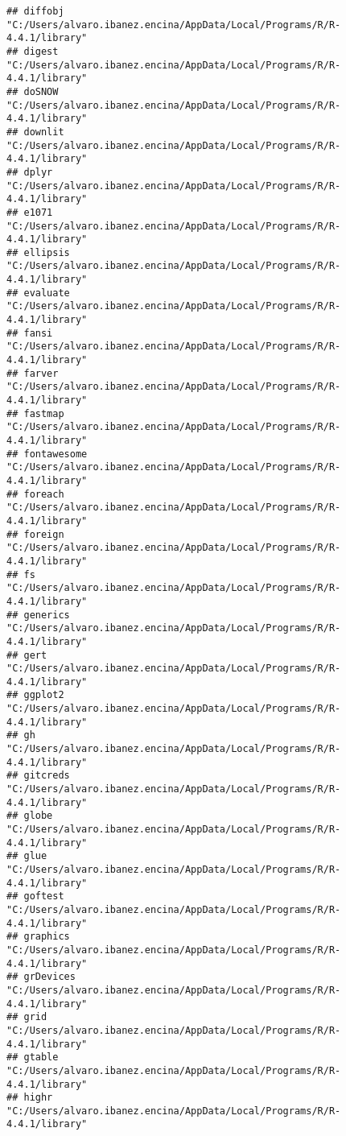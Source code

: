 \documentclass[
]{article}
\begin{document}
\begin{verbatim}
## diffobj            "C:/Users/alvaro.ibanez.encina/AppData/Local/Programs/R/R-4.4.1/library"
## digest             "C:/Users/alvaro.ibanez.encina/AppData/Local/Programs/R/R-4.4.1/library"
## doSNOW             "C:/Users/alvaro.ibanez.encina/AppData/Local/Programs/R/R-4.4.1/library"
## downlit            "C:/Users/alvaro.ibanez.encina/AppData/Local/Programs/R/R-4.4.1/library"
## dplyr              "C:/Users/alvaro.ibanez.encina/AppData/Local/Programs/R/R-4.4.1/library"
## e1071              "C:/Users/alvaro.ibanez.encina/AppData/Local/Programs/R/R-4.4.1/library"
## ellipsis           "C:/Users/alvaro.ibanez.encina/AppData/Local/Programs/R/R-4.4.1/library"
## evaluate           "C:/Users/alvaro.ibanez.encina/AppData/Local/Programs/R/R-4.4.1/library"
## fansi              "C:/Users/alvaro.ibanez.encina/AppData/Local/Programs/R/R-4.4.1/library"
## farver             "C:/Users/alvaro.ibanez.encina/AppData/Local/Programs/R/R-4.4.1/library"
## fastmap            "C:/Users/alvaro.ibanez.encina/AppData/Local/Programs/R/R-4.4.1/library"
## fontawesome        "C:/Users/alvaro.ibanez.encina/AppData/Local/Programs/R/R-4.4.1/library"
## foreach            "C:/Users/alvaro.ibanez.encina/AppData/Local/Programs/R/R-4.4.1/library"
## foreign            "C:/Users/alvaro.ibanez.encina/AppData/Local/Programs/R/R-4.4.1/library"
## fs                 "C:/Users/alvaro.ibanez.encina/AppData/Local/Programs/R/R-4.4.1/library"
## generics           "C:/Users/alvaro.ibanez.encina/AppData/Local/Programs/R/R-4.4.1/library"
## gert               "C:/Users/alvaro.ibanez.encina/AppData/Local/Programs/R/R-4.4.1/library"
## ggplot2            "C:/Users/alvaro.ibanez.encina/AppData/Local/Programs/R/R-4.4.1/library"
## gh                 "C:/Users/alvaro.ibanez.encina/AppData/Local/Programs/R/R-4.4.1/library"
## gitcreds           "C:/Users/alvaro.ibanez.encina/AppData/Local/Programs/R/R-4.4.1/library"
## globe              "C:/Users/alvaro.ibanez.encina/AppData/Local/Programs/R/R-4.4.1/library"
## glue               "C:/Users/alvaro.ibanez.encina/AppData/Local/Programs/R/R-4.4.1/library"
## goftest            "C:/Users/alvaro.ibanez.encina/AppData/Local/Programs/R/R-4.4.1/library"
## graphics           "C:/Users/alvaro.ibanez.encina/AppData/Local/Programs/R/R-4.4.1/library"
## grDevices          "C:/Users/alvaro.ibanez.encina/AppData/Local/Programs/R/R-4.4.1/library"
## grid               "C:/Users/alvaro.ibanez.encina/AppData/Local/Programs/R/R-4.4.1/library"
## gtable             "C:/Users/alvaro.ibanez.encina/AppData/Local/Programs/R/R-4.4.1/library"
## highr              "C:/Users/alvaro.ibanez.encina/AppData/Local/Programs/R/R-4.4.1/library"

\end{verbatim}
\end{document}

